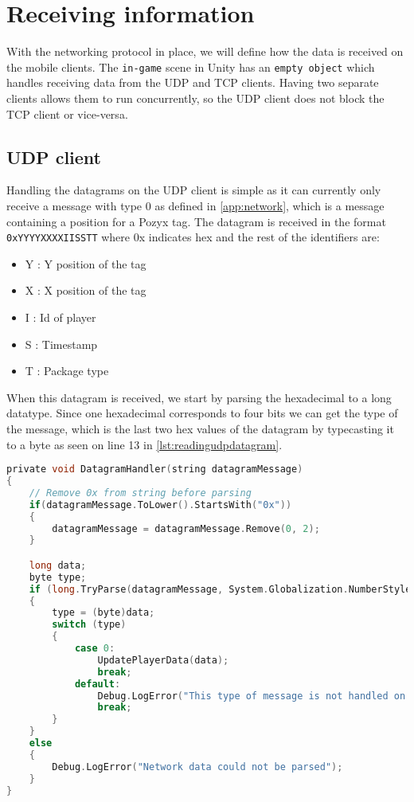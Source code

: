 \section{Receiving information}
With the networking protocol in place, we will define how the data is received on the mobile clients.
The \texttt{in-game} scene in Unity has an \texttt{empty object} which handles receiving data from the UDP and TCP clients.
Having two separate clients allows them to run concurrently, so the UDP client does not block the TCP client or vice-versa.

\subsection*{UDP client}
Handling the datagrams on the UDP client is simple as it can currently only receive a message with type 0 as defined in \autoref{app:network}, which is a message containing a position for a Pozyx tag.
The datagram is received in the format \texttt{0xYYYYXXXXIISSTT} where 0x indicates hex and the rest of the identifiers are:
\begin{itemize}
    \item Y : Y position of the tag
    \item X : X position of the tag
    \item I : Id of player
    \item S : Timestamp
    \item T : Package type
\end{itemize}

\noindent
When this datagram is received, we start by parsing the hexadecimal to a long datatype.
Since one hexadecimal corresponds to four bits we can get the type of the message, which is the last two hex values of the datagram by typecasting it to a byte as seen on line 13 in \autoref{lst:readingudpdatagram}.

\begin{lstlisting}[caption={Processing datagrams in UDP client}, captionpos=b,language=C,label={lst:readingudpdatagram}]
private void DatagramHandler(string datagramMessage)
{
    // Remove 0x from string before parsing
    if(datagramMessage.ToLower().StartsWith("0x"))
    {
        datagramMessage = datagramMessage.Remove(0, 2);
    }

    long data;
    byte type;
    if (long.TryParse(datagramMessage, System.Globalization.NumberStyles.HexNumber, System.Globalization.CultureInfo.InvariantCulture, out data))
    {
        type = (byte)data;
        switch (type)
        {
            case 0:
                UpdatePlayerData(data);
                break;
            default:
                Debug.LogError("This type of message is not handled on UDP");
                break;
        }
    }
    else
    {
        Debug.LogError("Network data could not be parsed");
    }
}
\end{lstlisting}

